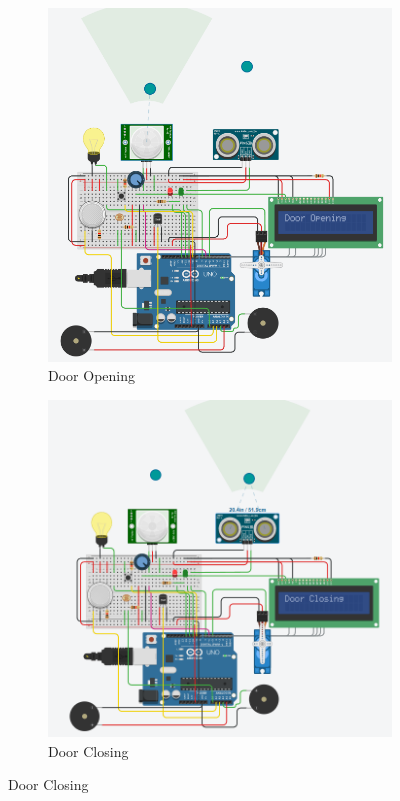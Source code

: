 \documentclass{article}
\begin{document}
\begin{figure}[H]
    \centering
    \begin{subfigure}{0.45\textwidth}
        \centering
        \includegraphics[width=\linewidth]{door_opening.png}
        \caption{Door Opening}
    \end{subfigure}
    \hfill
    \begin{subfigure}{0.45\textwidth}
        \centering
        \includegraphics[width=\linewidth]{door_closing.png}
        \caption{Door Closing}
    \end{subfigure}
    

\end{figure}
\end{document}
